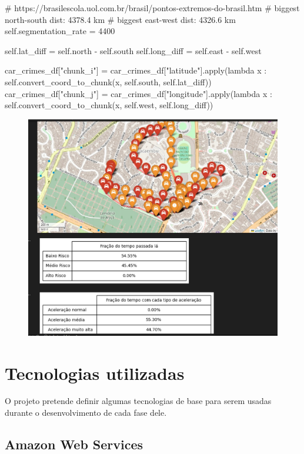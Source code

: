 		# https://brasilescola.uol.com.br/brasil/pontos-extremos-do-brasil.htm
		# biggest north-south dist: 4378.4 km
		# biggest east-west dist: 4326.6 km
		self.segmentation_rate = 4400

		self.lat_diff = self.north - self.south
		self.long_diff = self.east - self.west

		
		car_crimes_df["chunk_i"] = car_crimes_df["latitude"].apply(lambda x : self.convert_coord_to_chunk(x, self.south, self.lat_diff))
		car_crimes_df["chunk_j"] = car_crimes_df["longitude"].apply(lambda x : self.convert_coord_to_chunk(x, self.west, self.long_diff))

\begin{figure}[hp]
    \centering
    
    \includegraphics[scale=0.8]{figures/rotas_altorisco.jpeg}
    
    \caption{}
    
    \label{fig:rotas_altorisco}
\end{figure}

 
\section{Tecnologias utilizadas}
O projeto pretende definir algumas tecnologias de base para serem usadas durante o desenvolvimento de cada fase dele.

    \subsection{Amazon Web Services}

